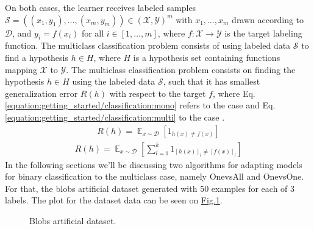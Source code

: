\documentclass[letterpaper,10pt,english]{sphinxmanual}
\let\sphinxpxdimen\pdfpxdimen\else\newdimen\sphinxpxdimen
\begin{document}
\sphinxAtStartPar
On both cases, the learner receives labeled samples \(\mathcal{S} = ((x_1, y_1), \dots, (x_m, y_m)) \in (\mathcal{X}, \mathcal{Y})^{m}\) with \(x_1, \dots, x_m\) drawn according
to \(\mathcal{D}\), and \(y_i = f(x_i)\) for all \(i \in [1, \dots, m]\), where \(f:\mathcal{X} \rightarrow \mathcal{Y}\) is the target labeling function. The multi\sphinxhyphen{}class classification problem consists
of using labeled data \(\mathcal{S}\) to find a hypothesis \(h \in H\), where \(H\) is a hypothesis set containing functions mapping \(\mathcal{X}\) to \(\mathcal{Y}\). The multi\sphinxhyphen{}class classification problem consists on finding the hypothesis \(h \in H\) using the labeled data \(\mathcal{S}\), such that
it has smallest generalization error \(R(h)\) with respect to the target \(f\), where Eq. \eqref{equation:getting_started/classification:mono} refers to the  case and Eq. \eqref{equation:getting_started/classification:multi} to the  case .
\begin{equation}\label{equation:getting_started/classification:mono}
\begin{split}R(h) = \mathop{\mathbb{E}}_{x \sim \mathcal{D}} [1_{h(x) \neq f(x)}]\end{split}
\end{equation}\begin{equation}\label{equation:getting_started/classification:multi}
\begin{split}R(h) = \mathop{\mathbb{E}}_{x \sim \mathcal{D}} [\sum_{l=1}^{k} 1_{[h(x)]_l \neq [f(x)]_l}]\end{split}
\end{equation}
\sphinxAtStartPar
In the following sections we’ll be discussing two algorithms for adapting models for binary classification to the multi\sphinxhyphen{}class case, namely One\sphinxhyphen{}vs\sphinxhyphen{}All and One\sphinxhyphen{}vs\sphinxhyphen{}One. For that,
the blobs artificial dataset generated with 50 examples for each of 3 labels. The plot for the dataset data can be seen on \hyperref[\detokenize{getting_started/classification:blobs-3class}]{Fig.\@ \ref{\detokenize{getting_started/classification:blobs-3class}}}.

\begin{figure}[htbp]
\centering
\capstart

\noindent\sphinxincludegraphics[width=450\sphinxpxdimen]{{blobs}.png}
\caption{Blobs artificial dataset.}\label{\detokenize{getting_started/classification:blobs-3class}}\end{figure}
\end{document}
